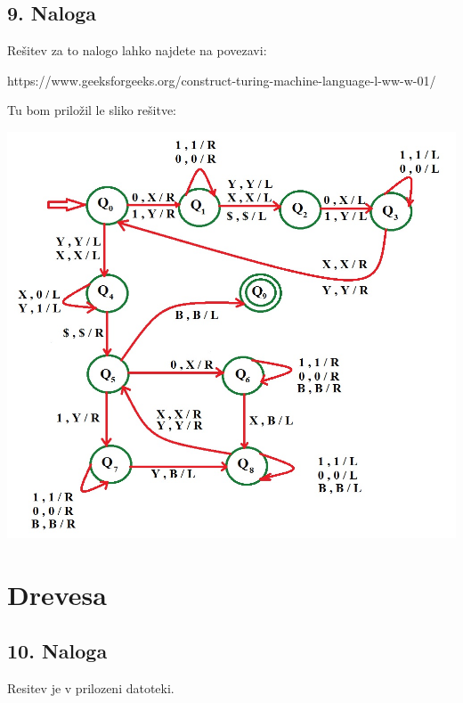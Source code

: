 \documentclass[a4paper,12pt]{article}
\begin{document}
\subsection{9. Naloga}
Rešitev za to nalogo lahko najdete na povezavi: 

https://www.geeksforgeeks.org/construct-turing-machine-language-l-ww-w-01/

Tu bom priložil le sliko rešitve:
\n

\includegraphics[width=\textwidth]{4-21.jpg}

\section{Drevesa}
\subsection{10. Naloga}
Resitev je v prilozeni datoteki.
\end{document}
